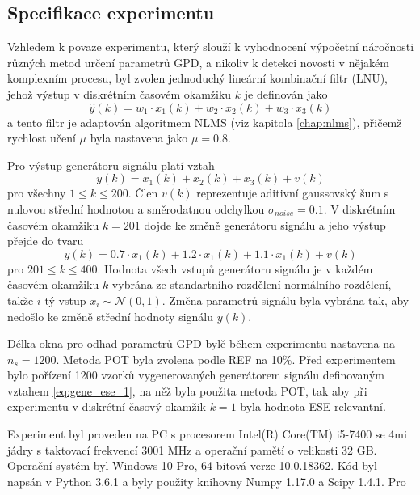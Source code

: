 \subsection{Specifikace experimentu}
Vzhledem k povaze experimentu, který slouží k vyhodnocení výpočetní náročnosti různých metod určení parametrů GPD, a nikoliv k detekci novosti v nějakém komplexním procesu, byl zvolen jednoduchý lineární kombinační filtr (LNU), jehož výstup v diskrétním časovém okamžiku $k$ je definován jako
\begin{equation}\label{eq:gene_ese_1}
\hat{y}(k)=w_1\cdot x_1(k)+w_2\cdot x_2(k)+w_3\cdot x_3(k)
\end{equation}
a tento filtr je adaptován algoritmem NLMS (viz kapitola \ref{chap:nlms}), přičemž rychlost učení $\mu$ byla nastavena jako $\mu=0.8$.
\par 
Pro výstup generátoru signálu platí vztah
\begin{equation}
y(k)=x_1(k)+x_2(k)+x_3(k)+v(k)
\end{equation}
pro všechny $1 \leq k \leq 200$. Člen $v(k)$ reprezentuje aditivní gaussovský šum s nulovou střední hodnotou a směrodatnou odchylkou $\sigma_{noise}=0.1$. V diskrétním časovém okamžiku $k=201$ dojde ke změně generátoru signálu a jeho výstup přejde do tvaru
\begin{equation}
y(k)=0.7\cdot x_1(k)+1.2\cdot x_1(k)+1.1 \cdot x_1(k) + v(k)
\end{equation}
pro $201 \leq k \leq 400$. Hodnota všech vstupů generátoru signálu je v každém časovém okamžiku $k$ vybrána ze standartního rozdělení normálního rozdělení, takže $i$-tý vstup $x_i\sim \mathcal{N}(0,1)$. Změna parametrů signálu byla vybrána tak, aby nedošlo ke změně střední hodnoty signálu $y(k)$.
\par
Délka okna pro odhad parametrů GPD bylě během experimentu nastavena na $n_s=1200$. Metoda POT byla zvolena podle REF na 10\%. Před experimentem bylo pořízení 1200 vzorků vygenerovaných generátorem signálu definovaným vztahem \ref{eq:gene_ese_1}, na něž byla použita metoda POT, tak aby při experimentu v diskrétní časový okamžik $k=1$ byla hodnota ESE relevantní.
\par
Experiment byl proveden na PC s procesorem Intel(R) Core(TM) i5-7400 se 4mi jádry s taktovací frekvencí 3001 MHz a operační pamětí o velikosti 32 GB. Operační systém byl Windows 10 Pro, 64-bitová verze 10.0.18362. Kód byl napsán v Python 3.6.1 a byly použity knihovny Numpy 1.17.0 a Scipy 1.4.1.
Pro


